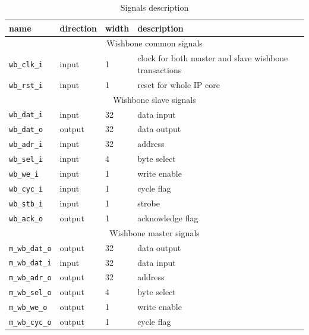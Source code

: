     \begin{table}
    \caption{Signals description}
        \begin{center}
            \begin{tabular}{l|l|l|l}
                    \rowcolor[gray]{0.7} name & direction & width & description \\ \hline \hline
                    \multicolumn{4}{c}{Wishbone common signals} \\ \hline
                    \texttt{wb\_clk\_i} & input & 1 & clock for both master and slave wishbone transactions \\ \hline
                    \texttt{wb\_rst\_i} & input & 1 & reset for whole IP core \\ \hline
                    \multicolumn{4}{c}{Wishbone slave signals} \\ \hline
                    \texttt{wb\_dat\_i} & input & 32 & data input \\ \hline
                    \texttt{wb\_dat\_o} & output & 32 & data output \\ \hline
                    \texttt{wb\_adr\_i} & input & 32 & address \\ \hline
                    \texttt{wb\_sel\_i} & input & 4 & byte select \\ \hline
                    \texttt{wb\_we\_i} & input & 1 & write enable \\ \hline
                    \texttt{wb\_cyc\_i} & input & 1 & cycle flag \\ \hline
                    \texttt{wb\_stb\_i} & input & 1 & strobe \\ \hline
                    \texttt{wb\_ack\_o} & output & 1 & acknowledge flag \\ \hline
                    \multicolumn{4}{c}{Wishbone master signals} \\ \hline
                    \texttt{m\_wb\_dat\_o} & output & 32 & data output \\ \hline
                    \texttt{m\_wb\_dat\_i} & input & 32 & data input \\ \hline
                    \texttt{m\_wb\_adr\_o} & output & 32 & address \\ \hline
                    \texttt{m\_wb\_sel\_o} & output & 4 & byte select \\ \hline
                    \texttt{m\_wb\_we\_o} & output & 1 & write enable \\ \hline
                    \texttt{m\_wb\_cyc\_o} & output & 1 & cycle flag \\ \hline

\end{tabular}
\end{center}
\end{table}
